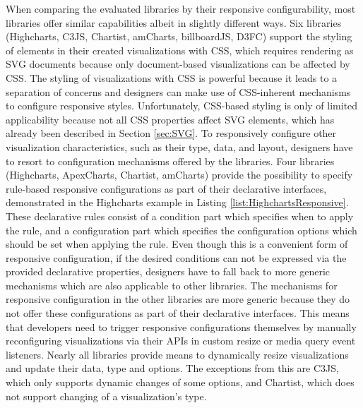 When comparing the evaluated libraries by their responsive configurability, most libraries offer similar capabilities albeit in slightly different ways.
Six libraries (Highcharts, C3JS, Chartist, amCharts, billboardJS, D3FC) support the styling of elements in their created visualizations with CSS, which requires rendering as SVG documents because only document-based visualizations can be affected by CSS.
The styling of visualizations with CSS is powerful because it leads to a separation of concerns and designers can make use of CSS-inherent mechanisms to configure responsive styles.
Unfortunately, CSS-based styling is only of limited applicability because not all CSS properties affect SVG elements, which has already been described in Section \ref{sec:SVG}.
To responsively configure other visualization characteristics, such as their type, data, and layout, designers have to resort to configuration mechanisms offered by the libraries. 
Four libraries (Highcharts, ApexCharts, Chartist, amCharts) provide the possibility to specify rule-based responsive configurations as part of their declarative interfaces, demonstrated in the Highcharts example in Listing \ref{list:HighchartsResponsive}.
These declarative rules consist of a condition part which specifies when to apply the rule, and a configuration part which specifies the configuration options which should be set when applying the rule.
Even though this is a convenient form of responsive configuration, if the desired conditions can not be expressed via the provided declarative properties, designers have to fall back to more generic mechanisms which are also applicable to other libraries. 
The mechanisms for responsive configuration in the other libraries are more generic because they do not offer these configurations as part of their declarative interfaces. 
This means that developers need to trigger responsive configurations themselves by manually reconfiguring visualizations via their APIs in custom resize or media query event listeners.
Nearly all libraries provide means to dynamically resize visualizations and update their data, type and options.
The exceptions from this are C3JS, which only supports dynamic changes of some options, and Chartist, which does not support changing of a visualization's type.

\begin{samepage}
 
    This example demonstrates how responsive rules can be declared to configure various aspects of a visualization in relation to the size of the viewport.
  },
]{listings/highcharts-responsive.js}
\end{samepage}